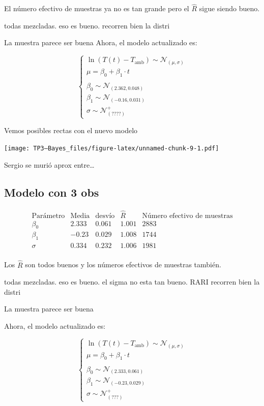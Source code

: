 \documentclass[
]{article}
\begin{document}
El número efectivo de muestras ya no es tan grande pero el \(\hat{R}\)
sigue siendo bueno.

todas mezcladas. eso es bueno. recorren bien la distri

La muestra parece ser buena Ahora, el modelo actualizado es:

\[
\begin{cases}
\ln(T(t) - T_{\mathrm{amb}}) \sim\mathcal{N}_{(\mu, \sigma)} \\
\mu = \beta_{0} + \beta_{1}\cdot t \\
\\
\beta_0 \sim \mathcal{N}_{(2.362, 0.048)} \\
\beta_1 \sim \mathcal{N}_{(-0.16, 0.031)} \\
\sigma \sim \mathcal{N}^{+}_{(????)}
\end{cases}
\]

Vemos posibles rectas con el nuevo modelo

\texttt{[image: TP3---Bayes\_files/figure-latex/unnamed-chunk-9-1.pdf]}

Sergio se murió aprox entre\ldots{}

\hypertarget{modelo-con-3-obs}{%
\subsection{Modelo con 3 obs}\label{modelo-con-3-obs}}

\[
\begin{array}{c|cc|cc}
\text{Parámetro} &\text{Media} &\text{desvío} & \hat{R} & \text{Número efectivo de muestras} \\
\hline
\beta_0 & 2.333 & 0.061 & 1.001 & 2883 \\
\beta_1 & -0.23 & 0.029 & 1.008 & 1744 \\
\sigma & 0.334 & 0.232 & 1.006 & 1981 \\
\end{array}
\]

Los \(\hat{R}\) son todos buenos y los números efectivos de muestras
también.

todas mezcladas. eso es bueno. el sigma no esta tan bueno. RARI recorren
bien la distri

La muestra parece ser buena

Ahora, el modelo actualizado es:

\[
\begin{cases}
\ln(T(t) - T_{\mathrm{amb}}) \sim\mathcal{N}_{(\mu, \sigma)} \\
\mu = \beta_{0} + \beta_{1}\cdot t \\
\\
\beta_0 \sim \mathcal{N}_{(2.333, 0.061)} \\
\beta_1 \sim \mathcal{N}_{(-0.23, 0.029)} \\
\sigma \sim \mathcal{N}^{+}_{(???)}
\end{cases}
\]
\end{document}
